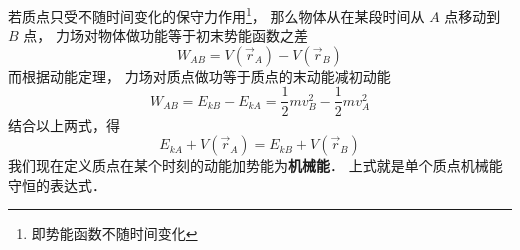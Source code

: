 

若质点只受不随时间变化的保守力作用\footnote{即势能函数不随时间变化}， 那么物体从在某段时间从 $A$ 点移动到 $B$ 点， 力场对物体做功能等于初末势能函数之差
\begin{equation}
W_{AB} = V(\vec r_A) - V(\vec r_B)
\end{equation}
而根据动能定理， 力场对质点做功等于质点的末动能减初动能
\begin{equation}
W_{AB} = E_{kB} - E_{kA} = \frac 12 m v_B^2 - \frac 12 m v_A^2
\end{equation}
结合以上两式，得
\begin{equation}
E_{kA} + V(\vec r_A) = E_{kB} + V(\vec r_B)
\end{equation}
我们现在定义质点在某个时刻的动能加势能为\textbf{机械能}． 上式就是单个质点机械能守恒的表达式．
